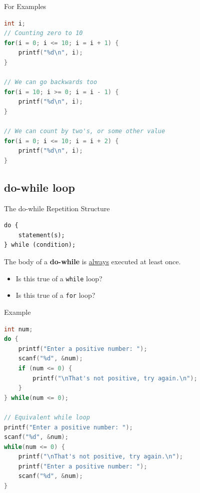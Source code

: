\documentclass[graphics]{beamer}
\begin{document}
\begin{frame}[fragile]{For Examples}
    \begin{lstlisting}[language=C,basicstyle=\footnotesize,keywordstyle=\color{blue},commentstyle=\color{green},showstringspaces=false,stringstyle=\color{red}]
int i;
// Counting zero to 10
for(i = 0; i <= 10; i = i + 1) {
    printf("%d\n", i);
}

// We can go backwards too
for(i = 10; i >= 0; i = i - 1) {
    printf("%d\n", i);
}

// We can count by two's, or some other value
for(i = 0; i <= 10; i = i + 2) {
    printf("%d\n", i);
}
\end{lstlisting}
\end{frame}

\subsection{do-while loop}
\begin{frame}[fragile]{The do-while Repetition Structure}
    \begin{verbatim}
do {
    statement(s);
} while (condition);
    \end{verbatim}
    The body of a \textbf{do-while} is \underline{always} executed at least once.
    \begin{itemize}
        \item Is this true of a \texttt{while} loop?
        \item Is this true of a \texttt{for} loop?
    \end{itemize}
\end{frame}

\begin{frame}[fragile]{Example}
    \begin{lstlisting}[language=C,basicstyle=\footnotesize,keywordstyle=\color{blue},commentstyle=\color{green},showstringspaces=false,stringstyle=\color{red}]
int num;
do {
    printf("Enter a positive number: ");
    scanf("%d", &num);
    if (num <= 0) {
        printf("\nThat's not positive, try again.\n");
    }
} while(num <= 0);

// Equivalent while loop
printf("Enter a positive number: ");
scanf("%d", &num);
while(num <= 0) {
    printf("\nThat's not positive, try again.\n");
    printf("Enter a positive number: ");
    scanf("%d", &num);
}
    \end{lstlisting}
\end{frame}
\end{document}
